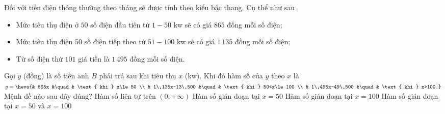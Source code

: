 

\begin{ex}%
	Đối với tiền điện thông thường theo tháng sẽ được  tính theo kiểu bậc thang. Cụ thể như sau
	\begin{itemize}
		\item  Mức tiêu thụ điện ở $50$ số điện đầu tiên từ $1-50$ kw sẽ có giá $865$ đồng mỗi số điện;
		\item Mức tiêu thụ điện $50$ số điện tiếp theo từ  $51-100$ kw sẽ có giá $1\,135$ đồng mỗi số điện;
		 \item Từ số điện thứ $101$ giá tiền là $1\,495$ đồng mỗi số điện.
	\end{itemize}
	Gọi $y$ (đồng) là số tiền anh $B$ phải trả sau khi tiêu thụ $x$ (kw). Khi đó hàm số của $y$ theo $x$ là $y=\heva{& 865x &\quad& \text{ khi } x\le  50 \\ & 1\,135x-13\,500 &\quad& \text{ khi } 50<x\le 100 \\ & 1\,495x-49\,500 &\quad& \text{ khi } x>100.}$\\
	Mệnh đề  nào sau đây đúng?
	 \choice
		{\True Hàm số liên tự  trên $(0;+\infty)$}
		{Hàm số gián đoạn tại  $x=50$}
		{Hàm số gián  đoạn tại $x=100$}
		{Hàm số gián đoạn tại $x=50$ và $x=100$} 
\end{ex}

